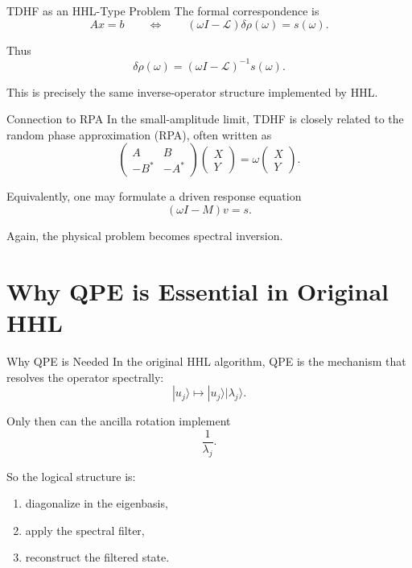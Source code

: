\documentclass{beamer}
\begin{document}

\begin{frame}{TDHF as an HHL-Type Problem}
The formal correspondence is
\[
A x = b
\qquad \Longleftrightarrow \qquad
(\omega I - \mathcal{L}) \delta \rho(\omega) = s(\omega).
\]

Thus
\[
\delta \rho(\omega)
=
(\omega I - \mathcal{L})^{-1} s(\omega).
\]

This is precisely the same inverse-operator structure implemented by HHL.
\end{frame}


\begin{frame}{Connection to RPA}
In the small-amplitude limit, TDHF is closely related to the random phase approximation (RPA), often written as
\[
\begin{pmatrix}
A & B \\
-B^* & -A^*
\end{pmatrix}
\begin{pmatrix}
X \\ Y
\end{pmatrix}
=
\omega
\begin{pmatrix}
X \\ Y
\end{pmatrix}.
\]

Equivalently, one may formulate a driven response equation
\[
(\omega I - M) v = s.
\]

Again, the physical problem becomes spectral inversion.
\end{frame}

\section{Why QPE is Essential in Original HHL}

\begin{frame}{Why QPE is Needed}
In the original HHL algorithm, QPE is the mechanism that resolves the operator spectrally:
\[
|u_j\rangle \mapsto |u_j\rangle |\lambda_j\rangle.
\]

Only then can the ancilla rotation implement
\[
\frac{1}{\lambda_j}.
\]

So the logical structure is:
\begin{enumerate}
\item diagonalize in the eigenbasis,
\item apply the spectral filter,
\item reconstruct the filtered state.
\end{enumerate}
\end{frame}
\end{document}
